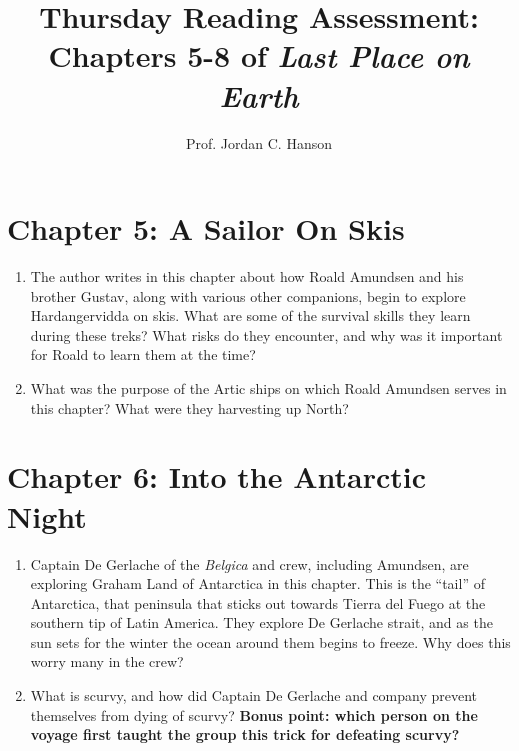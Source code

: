 \documentclass{article}
\begin{document}
\title{Thursday Reading Assessment: Chapters 5-8 of \textit{Last Place on Earth}}
\author{Prof. Jordan C. Hanson}

\maketitle

\section{Chapter 5: A Sailor On Skis}

\begin{enumerate}
\item The author writes in this chapter about how Roald Amundsen and his brother Gustav, along with various other companions, begin to explore Hardangervidda on skis.  What are some of the survival skills they learn during these treks?  What risks do they encounter, and why was it important for Roald to learn them at the time? \\ \vspace{4cm}
\item What was the purpose of the Artic ships on which Roald Amundsen serves in this chapter?  What were they harvesting up North? \\ \vspace{2cm}
\end{enumerate}

\section{Chapter 6: Into the Antarctic Night}

\begin{enumerate}
\item Captain De Gerlache of the \textit{Belgica} and crew, including Amundsen, are exploring Graham Land of Antarctica in this chapter.  This is the ``tail'' of Antarctica, that peninsula that sticks out towards Tierra del Fuego at the southern tip of Latin America.  They explore De Gerlache strait, and as the sun sets for the winter the ocean around them begins to freeze.  Why does this worry many in the crew? \\ \vspace{3cm}
\item What is scurvy, and how did Captain De Gerlache and company prevent themselves from dying of scurvy?  \textbf{Bonus point: which person on the voyage first taught the group this trick for defeating scurvy?}\\ \vspace{3cm}
\end{enumerate}
\end{document}
